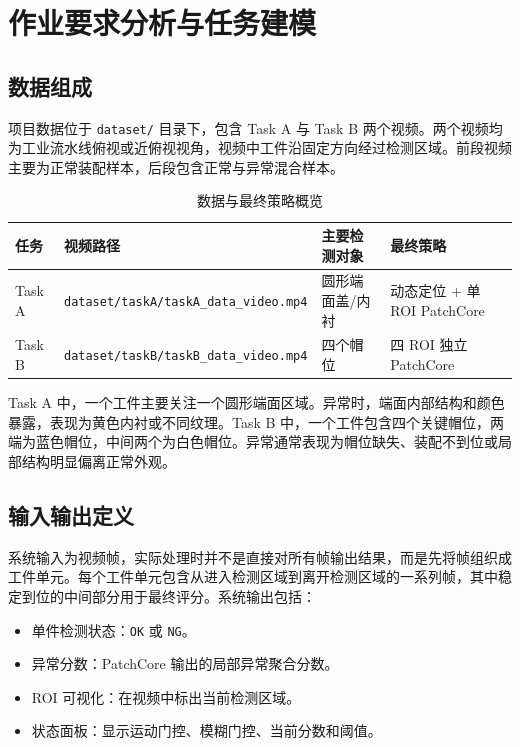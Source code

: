 \documentclass[12pt,hyperref,a4paper,UTF8,fontset=fandol]{ctexart}
\begin{document}
\newpage
\section{作业要求分析与任务建模}

\subsection{数据组成}

项目数据位于 \texttt{dataset/} 目录下，包含 Task A 与 Task B 两个视频。两个视频均为工业流水线俯视或近俯视视角，视频中工件沿固定方向经过检测区域。前段视频主要为正常装配样本，后段包含正常与异常混合样本。

\begin{table}[H]
    \centering
    \begin{tabular}{llll}
        \toprule
        任务 & 视频路径 & 主要检测对象 & 最终策略 \\
        \midrule
        Task A & \texttt{dataset/taskA/taskA\_data\_video.mp4} & 圆形端面盖/内衬 & 动态定位 + 单 ROI PatchCore \\
        Task B & \texttt{dataset/taskB/taskB\_data\_video.mp4} & 四个帽位 & 四 ROI 独立 PatchCore \\
        \bottomrule
    \end{tabular}
    \caption{数据与最终策略概览}
\end{table}

Task A 中，一个工件主要关注一个圆形端面区域。异常时，端面内部结构和颜色暴露，表现为黄色内衬或不同纹理。Task B 中，一个工件包含四个关键帽位，两端为蓝色帽位，中间两个为白色帽位。异常通常表现为帽位缺失、装配不到位或局部结构明显偏离正常外观。

\subsection{输入输出定义}

系统输入为视频帧，实际处理时并不是直接对所有帧输出结果，而是先将帧组织成工件单元。每个工件单元包含从进入检测区域到离开检测区域的一系列帧，其中稳定到位的中间部分用于最终评分。系统输出包括：

\begin{itemize}
    \item 单件检测状态：\texttt{OK} 或 \texttt{NG}。
    \item 异常分数：PatchCore 输出的局部异常聚合分数。
    \item ROI 可视化：在视频中标出当前检测区域。
    \item 状态面板：显示运动门控、模糊门控、当前分数和阈值。
\end{itemize}
\end{document}

